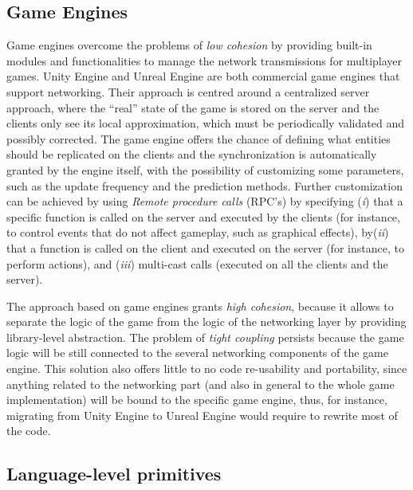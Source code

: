 \subsection{Game Engines}

Game engines overcome the problems of \textit{low cohesion} by providing built-in modules and functionalities to manage the network transmissions for multiplayer games. Unity Engine \cite{engine9unity} and Unreal Engine \cite{games2006unreal} are both commercial game engines that support networking. Their approach is centred around a centralized server approach, where the ``real'' state of the game is stored on the server and the clients only see its local approximation, which must be periodically validated and possibly corrected. The game engine offers the chance of defining what entities should be replicated on the clients and the synchronization is automatically granted by the engine itself, with the possibility of customizing some parameters, such as the update frequency and the prediction methods. Further customization can be achieved by using \textit{Remote procedure calls} (RPC's) by specifying (\textit{i}) that a specific function is called on the server and executed by the clients (for instance, to control events that do not affect gameplay, such as graphical effects), by(\textit{ii}) that a function is called on the client and executed on the server (for instance, to perform actions), and (\textit{iii}) multi-cast calls (executed on all the clients and the server).

The approach based on game engines grants \textit{high cohesion}, because it allows to separate the logic of the game from the logic of the networking layer by providing library-level abstraction. The problem of \textit{tight coupling} persists because the game logic will be still connected to the several networking components of the game engine. This solution also offers little to no code re-usability and portability, since anything related to the networking part (and also in general to the whole game implementation) will be bound to the specific game engine, thus, for instance, migrating from Unity Engine to Unreal Engine would require to rewrite most of the code.

\subsection{Language-level primitives}

